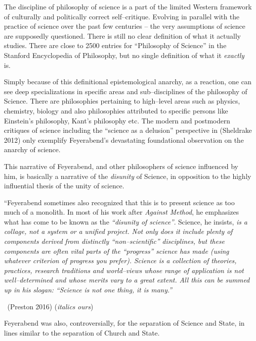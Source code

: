 The discipline of philosophy of science is a part of the limited Western framework of culturally and politically correct self–critique. Evolving in parallel with the practice of science over the past few centuries – the very assumptions of science are supposedly questioned. There is still no clear definition of what it actually studies. There are close to 2500 entries for “Philosophy of Science” in the Stanford Encyclopedia of Philosophy, but no single definition of what it \textit{exactly} is.

Simply because of this definitional epistemological anarchy, as a reaction, one can see deep specializations in specific areas and sub–disciplines of the philosophy of Science. There are philosophies pertaining to high–level areas such as physics, chemistry, biology and also philosophies attributed to specific persons like Einstein’s philosophy, Kant’s philosophy etc. The modern and postmodern critiques of science including the “science as a delusion” perspective in (Sheldrake 2012) only exemplify Feyerabend’s devastating foundational observation on the anarchy of science.

This narrative of Feyerabend, and other philosophers of science influenced by him, is basically a narrative of the \textit{disunity} of Science, in opposition to the highly influential thesis of the unity of science.

\begin{myquote}
“Feyerabend sometimes also recognized that this is to present science as too much of a monolith. In most of his work after \textit{Against Method}, he emphasizes what has come to be known as the \textit{“disunity of science”}. Science, he insists, \textit{is a collage, not a system or a unified project. Not only does it include plenty of components derived from distinctly “non–scientific” disciplines, but these components are often vital parts of the “progress” science has made (using whatever criterion of progress you prefer). Science is a collection of theories, practices, research traditions and world–views whose range of application is not well–determined and whose merits vary to a great extent. All this can be summed up in his slogan: “Science is not one thing, it is many.”} 

~\hfill (Preston 2016) (\textit{italics ours})
\end{myquote}

Feyerabend was also, controversially, for the separation of Science and State, in lines similar to the separation of Church and State.

